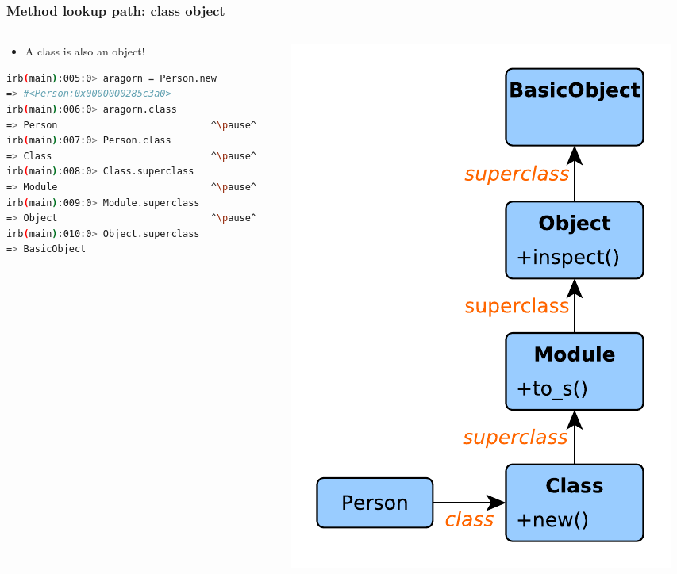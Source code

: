 \begin{frame}[fragile]\frametitle{Method lookup path: class object}

\begin{columns}[c] 

\begin{column}{7.4cm}

\begin{itemize}
\item A class is also an object!
\end{itemize}

\pause

\begin{lstlisting}[language=bash, escapechar={^}]
irb(main):005:0> aragorn = Person.new
=> #<Person:0x0000000285c3a0>
irb(main):006:0> aragorn.class
=> Person                           ^\pause^
irb(main):007:0> Person.class
=> Class                            ^\pause^
irb(main):008:0> Class.superclass
=> Module                           ^\pause^
irb(main):009:0> Module.superclass
=> Object                           ^\pause^
irb(main):010:0> Object.superclass 
=> BasicObject
\end{lstlisting}

\end{column}
\pause

\begin{column}{3.9cm}
\includegraphics[scale=0.55]{diagrams/class_object_lookup_path.pdf}
\end{column}

\end{columns}

\end{frame}




